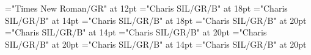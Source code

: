\documentclass[a4paper]{article}
\begin{document}
\pagestyle{plain}
\sloppy
\setlength{\parfillskip}{0pt plus 1fil}
\font\scrBookscrBody="Times New Roman/GR" at 12pt
\font\TitleMainscrBookscrBody="Charis SIL/GR/B" at 18pt
\font\TitleSecondarynkoTitleMainscrBookscrBody="Charis SIL/GR/B" at 14pt
\font\spannkoTitleMainscrBookscrBody="Charis SIL/GR/B" at 18pt
\font\TitleMainNonescrBookscrBody="Charis SIL/GR/B" at 20pt
\font\TitleSecondarynkoTitleMainNonescrBookscrBody="Charis SIL/GR/B" at 14pt
\font\spannkoTitleMainNonescrBookscrBody="Charis SIL/GR/B" at 20pt
\font\TitleMainNormalscrBookscrBody="Charis SIL/GR/B" at 20pt
\font\TitleSecondarynkoTitleMainNormalscrBookscrBody="Charis SIL/GR/B" at 14pt
\font\spannkoTitleMainNormalscrBookscrBody="Charis SIL/GR/B" at 20pt

\mbox{} 
\newpage 
\newpage 
\setcounter{page}{1} 
\pagestyle{fancy} 
\begin{spacing}{1}\begin{center}


\end{center}\end{spacing}\begin{center}


\end{center}\begin{spacing}{1.5}\begin{center}


\end{center}\end{spacing}
\end{document}
